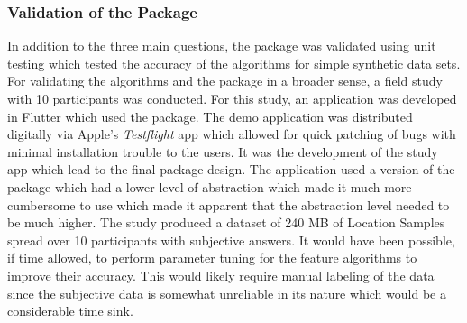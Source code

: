 \subsubsection*{Validation of the Package}
In addition to the three main questions, the package was validated using unit testing which tested the accuracy of the algorithms for simple synthetic data sets. For validating the algorithms and the package in a broader sense, a field study with 10 participants was conducted. For this study, an application was developed in Flutter which used the package. The demo application was distributed digitally via Apple's \textit{Testflight} app which allowed for quick patching of bugs with minimal installation trouble to the users. It was the development of the study app which lead to the final package design. The application used a version of the package which had a lower level of abstraction which made it much more cumbersome to use which made it apparent that the abstraction level needed to be much higher. The study produced a dataset of 240 MB of Location Samples spread over 10 participants with subjective answers. It would have been possible, if time allowed, to perform parameter tuning for the feature algorithms to improve their accuracy. This would likely require manual labeling of the data since the subjective data is somewhat unreliable in its nature which would be a considerable time sink.